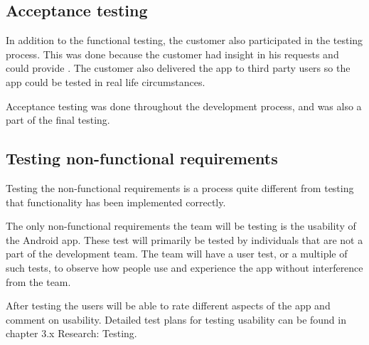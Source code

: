 \subsection{Acceptance testing}
In addition to the functional testing, the customer also participated in the testing process. This was done because the customer had insight in his requests and could provide . The customer also delivered the app to third party users so the app could be tested in real life circumstances.

Acceptance testing was done throughout the development process, and was also a part of the final testing.

 
\subsection{Testing non-functional requirements}
\label{sec:testingnonfunctionalrequirements}
Testing the non-functional requirements is a process quite different from testing that functionality has been implemented correctly.

The only non-functional requirements the team will be testing is the usability of the Android app. These test will primarily be 
tested by individuals that are not a part of the development team. The team will have a user test, or a multiple of such tests, to observe how people use and experience the app without interference from the team. 

After testing the users will be able to rate different aspects of the app and comment on usability. Detailed 
test plans for testing usability can be found in chapter 3.x Research: Testing.